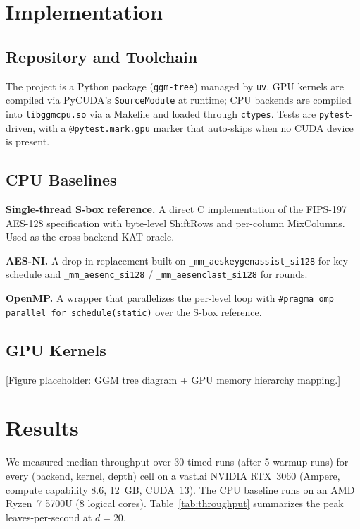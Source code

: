 \documentclass[10pt,conference]{IEEEtran}
\begin{document}
\section{Implementation}

\subsection{Repository and Toolchain}
The project is a Python package (\texttt{ggm-tree}) managed by \texttt{uv}.
GPU kernels are compiled via PyCUDA's \texttt{SourceModule} at runtime; CPU
backends are compiled into \texttt{libggmcpu.so} via a Makefile and loaded
through \texttt{ctypes}. Tests are \texttt{pytest}-driven, with a
\texttt{@pytest.mark.gpu} marker that auto-skips when no CUDA device is
present.

\subsection{CPU Baselines}
\textbf{Single-thread S-box reference.} A direct C implementation of the
FIPS-197 AES-128 specification with byte-level ShiftRows and per-column
MixColumns. Used as the cross-backend KAT oracle.

\textbf{AES-NI.} A drop-in replacement built on
\texttt{\_mm\_aeskeygenassist\_si128} for key schedule and
\texttt{\_mm\_aesenc\_si128} / \texttt{\_mm\_aesenclast\_si128} for rounds.

\textbf{OpenMP.} A wrapper that parallelizes the per-level loop with
\texttt{\#pragma omp parallel for schedule(static)} over the S-box reference.

\subsection{GPU Kernels}
[Figure placeholder: GGM tree diagram + GPU memory hierarchy mapping.]

\section{Results}

We measured median throughput over 30 timed runs (after 5 warmup runs) for
every (backend, kernel, depth) cell on a vast.ai NVIDIA RTX~3060 (Ampere,
compute capability 8.6, 12~GB, CUDA~13). The CPU baseline runs on an AMD
Ryzen~7 5700U (8 logical cores). Table~\ref{tab:throughput} summarizes the
peak leaves-per-second at $d{=}20$.
\end{document}
